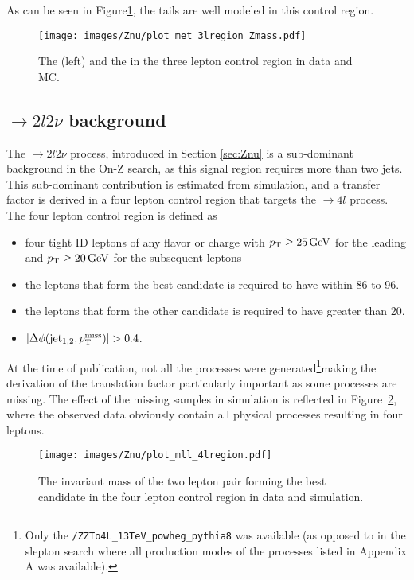 As can be seen in Figure\ref{fig:WZmetOnZ}, the \ptmiss tails are well modeled in this control region.
\begin{figure}[htbp!]
\begin{center}
\texttt{[image: images/Znu/plot\_met\_3lregion\_Zmass.pdf]}
\caption{The \ptmiss (left) and the \mttwo in the three lepton control region in data and MC. }
\label{fig:WZmetOnZ}
\end{center}
\end{figure}
\subsection*{\PZZ$\rightarrow2l2\nu$ background}
\noindent
The \PZZ$\rightarrow 2l2\nu$ process, introduced in Section \ref{sec:Znu} is a sub-dominant background in the On-Z search, as this signal region requires more than two jets.
This sub-dominant contribution is estimated from simulation, and a transfer factor is derived in a four lepton control region that targets the \PZZ$\rightarrow4l$ process. 
The four lepton control region is defined as
\begin{itemize}
    \item four tight ID leptons of any flavor or charge with $p_{\mathrm{T}}\geq25\,\text{Ge\hspace{-.08em}V}$ for the leading and $p_{\mathrm{T}}\geq20\,\text{Ge\hspace{-.08em}V}$ for the subsequent leptons
    \item the leptons that form the best \PZ candidate is required to have \mll within 86 to 96\GeV.
    \item the leptons that form the other \PZ candidate is required to have \mll greater than 20\GeV.
    \item $|\Delta\phi(\mathrm{jet_{1,2}}, \ptmiss)|>0.4$.
\end{itemize}
\newpara
\noindent\justify
At the time of publication, not all the \PZZ processes were generated\footnote{Only the \texttt{/ZZTo4L\_13TeV\_powheg\_pythia8} was available (as opposed to in the slepton search where all production modes of the \PZZ processes listed in Appendix A was available).}making the derivation of the translation factor particularly important as some processes are missing.
The effect of the missing samples in simulation is reflected in Figure~\ref{fig:ZZonZ}, where the observed data obviously contain all physical processes resulting in four leptons.
\begin{figure}[htbp!]
\begin{center}
\texttt{[image: images/Znu/plot\_mll\_4lregion.pdf]}
\caption{The invariant mass of the two lepton pair forming the best \PZ candidate in the four lepton control region in data and simulation.}
\label{fig:ZZonZ}
\end{center}
\end{figure}
